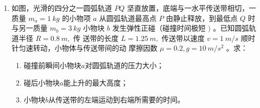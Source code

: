 \begin{enumerate}
\begin{enumerate}
	
	
	
	
	
\end{enumerate}
\begin{figure}[h!]
	\flushright
	
\end{figure}








\item 
如图，光滑的四分之一圆弧轨道 $P Q$ 坚直放置，底端与一水平传送带相切，一质量
$m_{a}=1 \ kg$ 的小物项 $a$ 从圆弧轨道最高点 $P$ 由静止释放，到最低点 $Q$ 时与另一质量
$m_{b}=3 \ kg$ 小物块 $b$ 发生弹性正碰（碰撞时间极短 $)$ 。已知圆弧轨道半径 $R=0.8 \ m,$ 传
送带的长度 $L=1.25 \ m,$ 传送带以速度 $v=1 \ m/s$ 顺时针匀速转动，小物体与传送带间的动
摩擦因数 $\mu=0.2,  g=10 \ m/s^{2}$ 。求：
\begin{enumerate}
	\item
	碰撞前瞬间小物块$ a $对圆弧轨道的压力大小； 
	\item 
	碰后小物块$ a $能上升的最大高度； 
	\item 
	小物块$ b $从传送带的左端运动到右端所需要的时间。
	
	
	
	
	
	
\end{enumerate}
\begin{figure}[h!]
	\flushright
	
\end{figure}





\end{enumerate}
